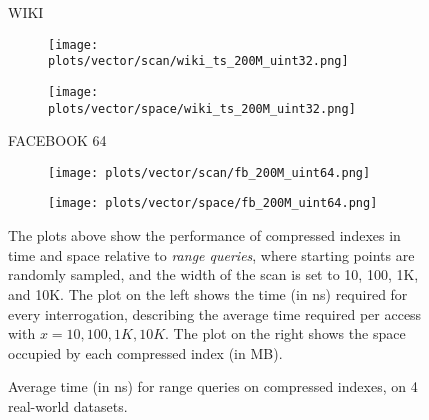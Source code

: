 \documentclass{article}
\begin{document}
\begin{figure}[!htbp]
{\begin{minipage}[t][0.98\textheight][t]{\textwidth}
    \begin{minipage}{0.03\linewidth}
    \begin{sideways}\small WIKI\end{sideways}
    \end{minipage}
    \begin{minipage}{0.32\linewidth}
        \begin{figure}[H]
        \texttt{[image: plots/vector/scan/wiki\_ts\_200M\_uint32.png]}
        \end{figure}
    \end{minipage}
    \begin{minipage}{0.32\linewidth}
        \begin{figure}[H]
            \texttt{[image: plots/vector/space/wiki\_ts\_200M\_uint32.png]}
        \end{figure}
    \end{minipage}
     \vspace*{-15px}

    \begin{minipage}{0.03\linewidth}
    \begin{sideways}\small FACEBOOK 64\end{sideways}
    \end{minipage}
    \begin{minipage}{0.32\linewidth}
        \begin{figure}[H]
        \texttt{[image: plots/vector/scan/fb\_200M\_uint64.png]}
        \end{figure}
    \end{minipage}
    \begin{minipage}{0.32\linewidth}
        \begin{figure}[H]
            \texttt{[image: plots/vector/space/fb\_200M\_uint64.png]}
        \end{figure}
    \end{minipage}
    \vfill

    \centering
    \begin{minipage}{\linewidth}
    The plots above show the performance of compressed indexes in time and space relative to \emph{range queries}, where starting points are randomly sampled, and the width of the scan is set to 10, 100, 1K, and 10K. The plot on the left shows the time (in ns) required for every interrogation, describing the average time required per access with $x = 10, 100, 1K, 10K$. The plot on the right shows the space occupied by each compressed index (in MB). 
    \end{minipage}
    \vspace{10px}
\end{minipage}
}
\caption{Average time (in ns) for range queries on compressed indexes, on 4 real-world datasets.}
\end{figure}
\end{document}
